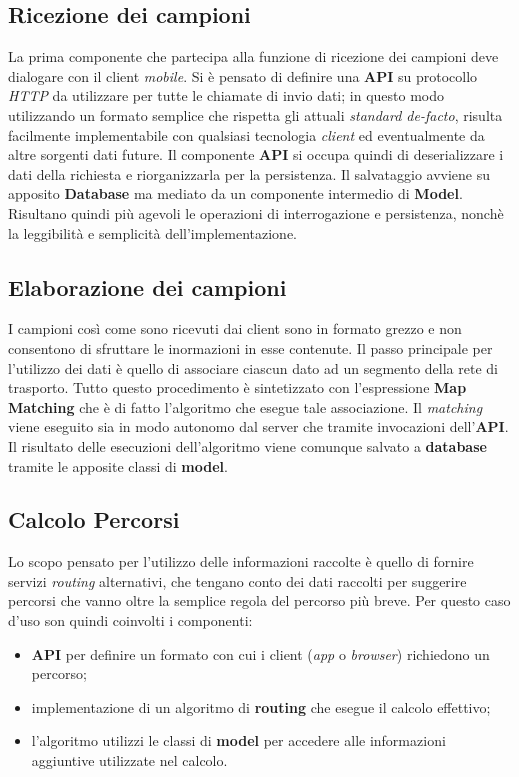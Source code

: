 \subsection{Ricezione dei campioni}
La prima componente che partecipa alla funzione di ricezione dei campioni deve dialogare con il client \emph{mobile}. Si è pensato di definire una \textbf{API} su protocollo \emph{HTTP} da utilizzare per tutte le chiamate di invio dati; in questo modo utilizzando un formato semplice che rispetta gli attuali \emph{standard de-facto}, risulta facilmente implementabile con qualsiasi tecnologia \emph{client} ed eventualmente da altre sorgenti dati future. Il componente \textbf{API} si occupa quindi di deserializzare i dati della richiesta e riorganizzarla per la persistenza. Il salvataggio avviene su apposito \textbf{Database} ma mediato da un componente intermedio di \textbf{Model}. Risultano quindi più agevoli le operazioni di interrogazione e persistenza, nonchè la leggibilità e semplicità dell'implementazione.

\subsection{Elaborazione dei campioni}
I campioni così come sono ricevuti dai client sono in formato grezzo e non consentono di sfruttare le inormazioni in esse contenute. Il passo principale per l'utilizzo dei dati è quello di associare ciascun dato ad un segmento della rete di trasporto. Tutto questo procedimento è sintetizzato con l'espressione \textbf{Map Matching} che è di fatto l'algoritmo che esegue tale associazione. Il \emph{matching} viene eseguito sia in modo autonomo dal server che tramite invocazioni dell'\textbf{API}. Il risultato delle esecuzioni dell'algoritmo viene comunque salvato a \textbf{database} tramite le apposite classi di \textbf{model}.

\subsection{Calcolo Percorsi}
Lo scopo pensato per l'utilizzo delle informazioni raccolte è quello di fornire servizi \emph{routing} alternativi, che tengano conto dei dati raccolti per suggerire percorsi che vanno oltre la semplice regola del percorso più breve. Per questo caso d'uso son quindi coinvolti i componenti:
\begin{itemize}
\item \textbf{API} per definire un formato con cui i client (\emph{app} o \emph{browser}) richiedono un percorso;
\item implementazione di un algoritmo di \textbf{routing} che esegue il calcolo effettivo;
\item l'algoritmo utilizzi le classi di \textbf{model} per accedere alle informazioni aggiuntive utilizzate nel calcolo.
\end{itemize}

